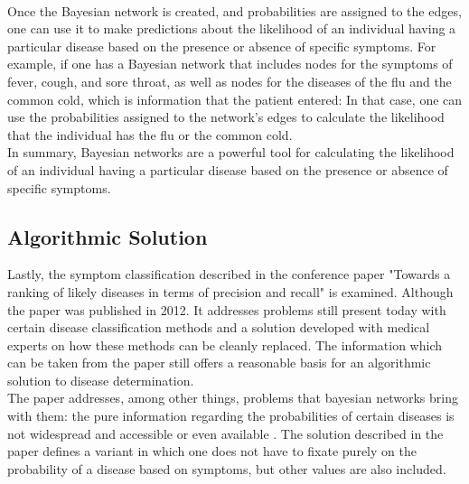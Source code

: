 \newline \\
Once the Bayesian network is created, and probabilities are assigned to the edges, one can use it to make predictions about the likelihood of an individual having a particular disease based on the presence or absence of specific symptoms. For example, if one has a Bayesian network that includes nodes for the symptoms of fever, cough, and sore throat, as well as nodes for the diseases of the flu and the common cold, which is information that the patient entered: In that case, one can use the probabilities assigned to the network's edges to calculate the likelihood that the individual has the flu or the common cold.
\newline \\
In summary, Bayesian networks are a powerful tool for calculating the likelihood of an individual having a particular disease based on the presence or absence of specific symptoms.

\subsection{Algorithmic Solution}
Lastly, the symptom classification described in the conference paper "Towards a ranking of likely diseases in terms of precision and recall" \cite{.algo} is examined. Although the paper was published in 2012. It addresses problems still present today with certain disease classification methods and a solution developed with medical experts on how these methods can be cleanly replaced. The information which can be taken from the paper still offers a reasonable basis for an algorithmic solution to disease determination. 
\newline \\
The paper addresses, among other things, problems that bayesian networks bring with them: the pure information regarding the probabilities of certain diseases is not widespread and accessible or even available \cite{.algo}. The solution described in the paper defines a variant in which one does not have to fixate purely on the probability of a disease based on symptoms, but other values are also included.

